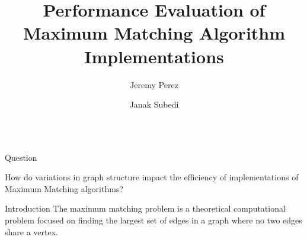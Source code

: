 \documentclass[final]{beamer}
\title{Performance Evaluation of Maximum Matching Algorithm Implementations} %
\author{Jeremy Perez \and Janak Subedi} %
\institute{Computer Science Department, Union College} %
\newlength{\sepwid}
\newlength{\onecolwid}
\begin{document}
  
  \begin{columns}[t]
    

    
    \begin{column}{\onecolwid} %
      
      
      
        
        


      \begin{alertblock}{Question}
        
        \noindent How do variations in graph structure impact the efficiency of implementations of Maximum Matching algorithms?
        
      \end{alertblock}

      
      \begin{block}{Introduction}
        \noindent The maximum matching problem is a theoretical computational problem focused on finding the largest set of edges in a graph where no two edges share a vertex. 


\end{block}
\end{column}
\end{columns}
\end{document}
